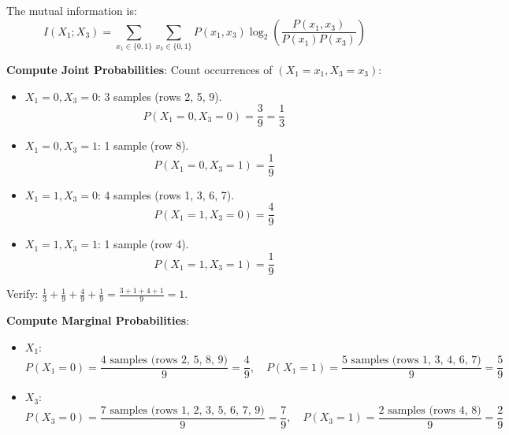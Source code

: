 \documentclass[a3paper,12pt]{extarticle} %
\begin{document}
\begin{enumerate}
The mutual information is:
\[
I(X_1; X_3) = \sum_{x_1 \in \{0,1\}} \sum_{x_3 \in \{0,1\}} P(x_1, x_3) \log_2 \left( \frac{P(x_1, x_3)}{P(x_1)P(x_3)} \right)
\]

\textbf{Compute Joint Probabilities}: Count occurrences of \((X_1 = x_1, X_3 = x_3)\):
\begin{itemize}
    \item \(X_1 = 0, X_3 = 0\): 3 samples (rows 2, 5, 9).
    \[
    P(X_1 = 0, X_3 = 0) = \frac{3}{9} = \frac{1}{3}
    \]
    \item \(X_1 = 0, X_3 = 1\): 1 sample (row 8).
    \[
    P(X_1 = 0, X_3 = 1) = \frac{1}{9}
    \]
    \item \(X_1 = 1, X_3 = 0\): 4 samples (rows 1, 3, 6, 7).
    \[
    P(X_1 = 1, X_3 = 0) = \frac{4}{9}
    \]
    \item \(X_1 = 1, X_3 = 1\): 1 sample (row 4).
    \[
    P(X_1 = 1, X_3 = 1) = \frac{1}{9}
    \]
\end{itemize}
Verify: \(\frac{1}{3} + \frac{1}{9} + \frac{4}{9} + \frac{1}{9} = \frac{3 + 1 + 4 + 1}{9} = 1\).

\textbf{Compute Marginal Probabilities}:
\begin{itemize}
    \item \(X_1\):
    \[
    P(X_1 = 0) = \frac{\text{4 samples (rows 2, 5, 8, 9)}}{9} = \frac{4}{9}, \quad P(X_1 = 1) = \frac{\text{5 samples (rows 1, 3, 4, 6, 7)}}{9} = \frac{5}{9}
    \]
    \item \(X_3\):
    \[
    P(X_3 = 0) = \frac{\text{7 samples (rows 1, 2, 3, 5, 6, 7, 9)}}{9} = \frac{7}{9}, \quad P(X_3 = 1) = \frac{\text{2 samples (rows 4, 8)}}{9} = \frac{2}{9}
    \]
\end{itemize}


\end{enumerate}
\end{document}
